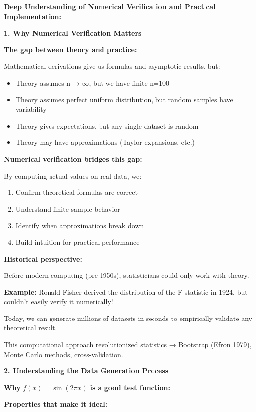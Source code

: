 \documentclass[12pt]{article}
\begin{document}
\begin{explanation}
\textbf{Deep Understanding of Numerical Verification and Practical Implementation:}

\textbf{1. Why Numerical Verification Matters}

\textbf{The gap between theory and practice:}

Mathematical derivations give us formulas and asymptotic results, but:
\begin{itemize}
    \item Theory assumes n → $\infty$, but we have finite n=100
    \item Theory assumes perfect uniform distribution, but random samples have variability
    \item Theory gives expectations, but any single dataset is random
    \item Theory may have approximations (Taylor expansions, etc.)
\end{itemize}

\textbf{Numerical verification bridges this gap:}

By computing actual values on real data, we:
\begin{enumerate}
    \item Confirm theoretical formulas are correct
    \item Understand finite-sample behavior
    \item Identify when approximations break down
    \item Build intuition for practical performance
\end{enumerate}

\textbf{Historical perspective:}

Before modern computing (pre-1950s), statisticians could only work with theory.

\textbf{Example:} Ronald Fisher derived the distribution of the F-statistic in 1924, but couldn't easily verify it numerically!

Today, we can generate millions of datasets in seconds to empirically validate any theoretical result.

This computational approach revolutionized statistics → Bootstrap (Efron 1979), Monte Carlo methods, cross-validation.

\textbf{2. Understanding the Data Generation Process}

\textbf{Why} $f(x) = \sin(2\pi x)$ \textbf{is a good test function:}

\textbf{Properties that make it ideal:}


\end{explanation}
\end{document}
